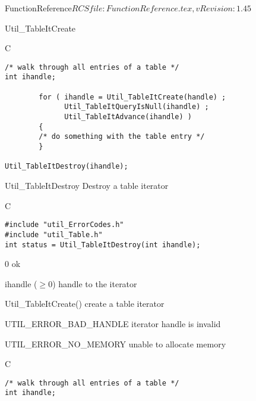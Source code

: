 \begin{cactuspart}{5}{FunctionReference}{$RCSfile: FunctionReference.tex,v $}{$Revision: 1.45 $}
\begin{FunctionDescription}{Util\_TableItCreate}
\begin{Example}{C}
\begin{verbatim}
/* walk through all entries of a table */
int ihandle;

        for ( ihandle = Util_TableItCreate(handle) ;
              Util_TableItQueryIsNull(ihandle) ;
              Util_TableItAdvance(ihandle) )
        {
        /* do something with the table entry */
        }

Util_TableItDestroy(ihandle);
\end{verbatim}
\end{Example}
\end{FunctionDescription}


\begin{FunctionDescription}{Util\_TableItDestroy}
\label{Util-TableItDestroy}
Destroy a table iterator

\begin{Synopsis}{C}
\begin{verbatim}
#include "util_ErrorCodes.h"
#include "util_Table.h"
int status = Util_TableItDestroy(int ihandle);
\end{verbatim}
\end{Synopsis}

\begin{Result}{\rm 0}
ok
\end{Result}

\begin{Parameter}{ihandle ($\ge 0$)}
handle to the iterator
\end{Parameter}

\begin{Discussion}
\end{Discussion}

\begin{SeeAlso}{Util\_TableItCreate()}
create a table iterator
\end{SeeAlso}

\begin{Error}{UTIL\_ERROR\_BAD\_HANDLE}
iterator handle is invalid
\end{Error}
\begin{Error}{UTIL\_ERROR\_NO\_MEMORY}
unable to allocate memory
\end{Error}

\begin{Example}{C}
\begin{verbatim}
/* walk through all entries of a table */
int ihandle;


\end{verbatim}
\end{Example}
\end{FunctionDescription}
\end{cactuspart}
